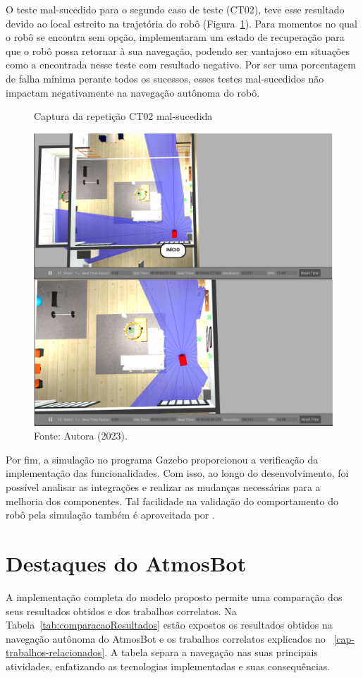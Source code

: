 O teste mal-sucedido para o segundo caso de teste (CT02), teve esse resultado devido ao local estreito na trajetória do robô (Figura~\ref{fig:erroCT02}). Para momentos no qual o robô se encontra sem opção, \citet{lidarRGBD} implementaram um estado de recuperação para que o robô possa retornar à sua navegação, podendo ser vantajoso em situações como a encontrada nesse teste com resultado negativo. Por ser uma porcentagem de falha mínima perante todos os sucessos, esses testes mal-sucedidos não impactam negativamente na navegação autônoma do robô. 

\begin{figure}[H]
    \centering
    \caption{Captura da repetição CT02 mal-sucedida}
    \includegraphics[scale=0.3]{ct02_4.png}
    \caption*{Fonte: Autora (2023).}
    \label{fig:erroCT02}
\end{figure}

Por fim, a simulação no programa Gazebo proporcionou a verificação da implementação das funcionalidades. Com isso, ao longo do desenvolvimento, foi possível analisar as integrações e realizar as mudanças necessárias para a melhoria dos componentes. Tal facilidade na validação do comportamento do robô pela simulação também é aproveitada por \citet{navegacaoSlam:2022, dpoom, lidarRGBD}. 

\section{Destaques do AtmosBot}
A implementação completa do modelo proposto permite uma comparação dos seus resultados obtidos e dos trabalhos correlatos. Na Tabela~\ref{tab:comparacaoResultados} estão expostos os resultados obtidos na navegação autônoma do AtmosBot e os trabalhos correlatos explicados no \chapterautorefname~\ref{cap-trabalhos-relacionados}. A tabela separa a navegação nas suas principais atividades, enfatizando as tecnologias implementadas e suas consequências.

